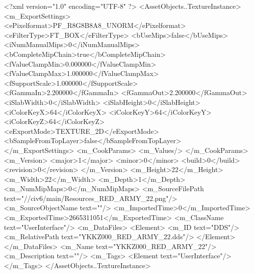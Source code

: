 <?xml version="1.0" encoding="UTF-8" ?>
<AssetObjects..TextureInstance>
	<m_ExportSettings>
		<ePixelformat>PF_R8G8B8A8_UNORM</ePixelformat>
		<eFilterType>FT_BOX</eFilterType>
		<bUseMips>false</bUseMips>
		<iNumManualMips>0</iNumManualMips>
		<bCompleteMipChain>true</bCompleteMipChain>
		<fValueClampMin>0.000000</fValueClampMin>
		<fValueClampMax>1.000000</fValueClampMax>
		<fSupportScale>1.000000</fSupportScale>
		<fGammaIn>2.200000</fGammaIn>
		<fGammaOut>2.200000</fGammaOut>
		<iSlabWidth>0</iSlabWidth>
		<iSlabHeight>0</iSlabHeight>
		<iColorKeyX>64</iColorKeyX>
		<iColorKeyY>64</iColorKeyY>
		<iColorKeyZ>64</iColorKeyZ>
		<eExportMode>TEXTURE_2D</eExportMode>
		<bSampleFromTopLayer>false</bSampleFromTopLayer>
	</m_ExportSettings>
	<m_CookParams>
		<m_Values/>
	</m_CookParams>
	<m_Version>
		<major>1</major>
		<minor>0</minor>
		<build>0</build>
		<revision>0</revision>
	</m_Version>
	<m_Height>22</m_Height>
	<m_Width>22</m_Width>
	<m_Depth>1</m_Depth>
	<m_NumMipMaps>0</m_NumMipMaps>
	<m_SourceFilePath text="//civ6/main/Resources_RED_ARMY_22.png"/>
	<m_SourceObjectName text=""/>
	<m_ImportedTime>0</m_ImportedTime>
	<m_ExportedTime>2665311051</m_ExportedTime>
	<m_ClassName text="UserInterface"/>
	<m_DataFiles>
		<Element>
			<m_ID text="DDS"/>
			<m_RelativePath text="YKKZ000_RED_ARMY_22.dds"/>
		</Element>
	</m_DataFiles>
	<m_Name text="YKKZ000_RED_ARMY_22"/>
	<m_Description text=""/>
	<m_Tags>
		<Element text="UserInterface"/>
	</m_Tags>
</AssetObjects..TextureInstance>

